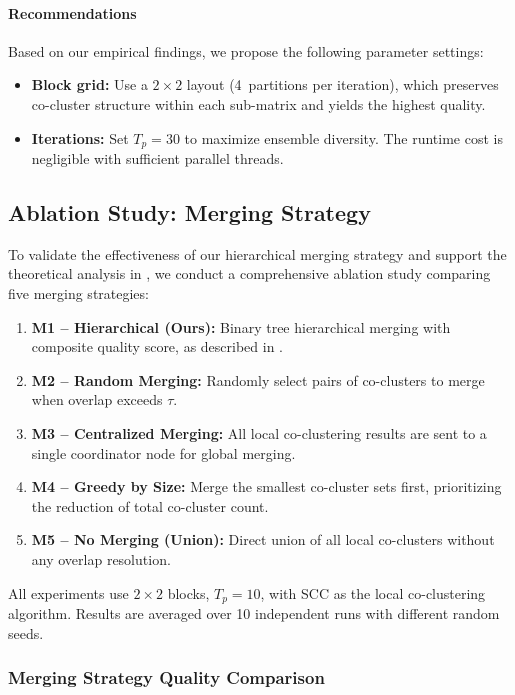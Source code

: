\documentclass[journal]{IEEEtran}
\theoremstyle{definition}
\theoremstyle{remark} %
\begin{document}
{\paragraph{Recommendations}
Based on our empirical findings, we propose the following parameter settings:
\begin{itemize}
    \item \textbf{Block grid:} Use a $2\times2$ layout (4~partitions per iteration), which preserves co-cluster structure within each sub-matrix and yields the highest quality.
    \item \textbf{Iterations:} Set $T_p = 30$ to maximize ensemble diversity. The runtime cost is negligible with sufficient parallel threads.
\end{itemize}
}

{\color{blue}
\subsection{Ablation Study: Merging Strategy}
\label{subsec:ablation}

To validate the effectiveness of our hierarchical merging strategy and support the theoretical analysis in , we conduct a comprehensive ablation study comparing five merging strategies:

\begin{enumerate}
    \item \textbf{M1 -- Hierarchical (Ours):} Binary tree hierarchical merging with composite quality score, as described in .
    \item \textbf{M2 -- Random Merging:} Randomly select pairs of co-clusters to merge when overlap exceeds $\tau$.
    \item \textbf{M3 -- Centralized Merging:} All local co-clustering results are sent to a single coordinator node for global merging.
    \item \textbf{M4 -- Greedy by Size:} Merge the smallest co-cluster sets first, prioritizing the reduction of total co-cluster count.
    \item \textbf{M5 -- No Merging (Union):} Direct union of all local co-clusters without any overlap resolution.
\end{enumerate}

All experiments use $2\times2$ blocks, $T_p=10$, with SCC as the local co-clustering algorithm. Results are averaged over 10 independent runs with different random seeds.

\subsubsection{Merging Strategy Quality Comparison}

}
\end{document}
